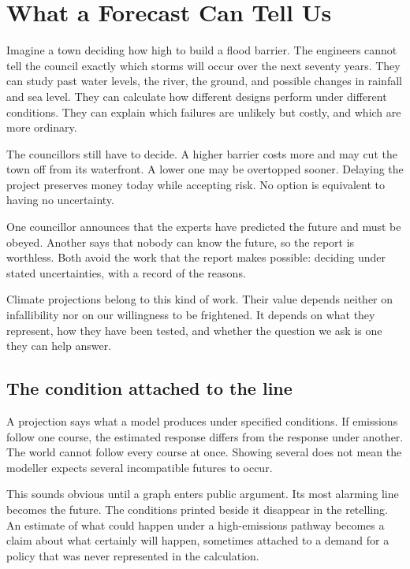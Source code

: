 \documentclass[12pt,a4paper]{book}
\begin{document}
\chapter{What a Forecast Can Tell Us}

Imagine a town deciding how high to build a flood barrier. The engineers cannot tell the council exactly which storms will occur over the next seventy years. They can study past water levels, the river, the ground, and possible changes in rainfall and sea level. They can calculate how different designs perform under different conditions. They can explain which failures are unlikely but costly, and which are more ordinary.

The councillors still have to decide. A higher barrier costs more and may cut the town off from its waterfront. A lower one may be overtopped sooner. Delaying the project preserves money today while accepting risk. No option is equivalent to having no uncertainty.

One councillor announces that the experts have predicted the future and must be obeyed. Another says that nobody can know the future, so the report is worthless. Both avoid the work that the report makes possible: deciding under stated uncertainties, with a record of the reasons.

Climate projections belong to this kind of work. Their value depends neither on infallibility nor on our willingness to be frightened. It depends on what they represent, how they have been tested, and whether the question we ask is one they can help answer.

\section*{The condition attached to the line}

A projection says what a model produces under specified conditions. If emissions follow one course, the estimated response differs from the response under another. The world cannot follow every course at once. Showing several does not mean the modeller expects several incompatible futures to occur.

This sounds obvious until a graph enters public argument. Its most alarming line becomes the future. The conditions printed beside it disappear in the retelling. An estimate of what could happen under a high-emissions pathway becomes a claim about what certainly will happen, sometimes attached to a demand for a policy that was never represented in the calculation.
\end{document}
